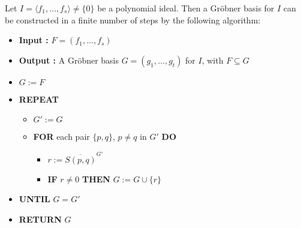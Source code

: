 \begin{theorem}
  \label{thm:Buchberger's_Algorithm}
  \leanok %
  Let $I = \langle f_1, \ldots, f_s \rangle \ne \{0\}$ be a polynomial ideal. Then a Gr{\"o}bner basis for $I$ can be constructed in a finite number of steps by the following algorithm:
  \normalfont %
  \begin{itemize}
      \item[] \textbf{Input :} $F = (f_1, \ldots, f_s)$
      \item[] \textbf{Output :} A Gr{\"o}bner basis $G = (g_1, \ldots, g_t)$ for $I$, with $F \subseteq G$
      \vspace{1ex}
      \item[] $G := F$
      \item[] \textbf{REPEAT}
      \begin{itemize}
          \item[] $G' := G$
          \item[] \textbf{FOR} each pair $\{p, q\}$, $p \ne q$ in $G'$ \textbf{DO}
          \begin{itemize}
              \item[] $r := \overline{S(p, q)}^{G'}$
              \item[] \textbf{IF} $r \ne 0$ \textbf{THEN} $G := G \cup \{r\}$
          \end{itemize}
      \end{itemize}
      \item[] \textbf{UNTIL} $G = G'$
      \item[] \textbf{RETURN} $G$
  \end{itemize}
\end{theorem}
